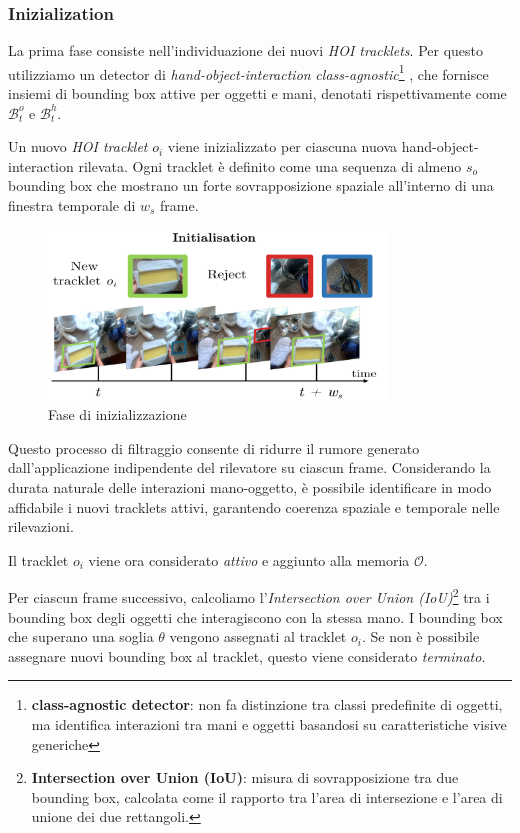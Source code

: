 \subsubsection*{Inizialization}
La prima fase consiste nell'individuazione dei nuovi \emph{HOI tracklets}. Per questo utilizziamo un detector di \emph{hand-object-interaction} \emph{class-agnostic}\footnote{\textbf{class-agnostic detector}: non fa distinzione tra classi predefinite di oggetti, ma identifica interazioni tra mani e oggetti basandosi su caratteristiche visive generiche} \cite{shan2020understandinghumanhandscontact}, che fornisce insiemi di bounding box attive per oggetti e mani, denotati rispettivamente come $\mathcal{B}_t^o$ e $\mathcal{B}_t^h$.

Un nuovo \emph{HOI tracklet} $o_i$ viene inizializzato per ciascuna nuova hand-object-interaction rilevata. Ogni tracklet è definito come una sequenza di almeno $s_o$ bounding box che mostrano un forte sovrapposizione spaziale all'interno di una finestra temporale di $w_s$ frame.

\begin{figure}[ht]
    \centering
    \includegraphics[width=0.8\textwidth]{Images/init.png}
    \caption{Fase di inizializzazione}
    \label{fig:init}
\end{figure}

Questo processo di filtraggio consente di ridurre il rumore generato dall'applicazione indipendente del rilevatore su ciascun frame. Considerando la durata naturale delle interazioni mano-oggetto, è possibile identificare in modo affidabile i nuovi tracklets attivi, garantendo coerenza spaziale e temporale nelle rilevazioni.  

Il tracklet $o_i$ viene ora considerato \emph{attivo} e aggiunto alla memoria $\mathcal{O}$.  

Per ciascun frame successivo, calcoliamo l'\emph{Intersection over Union (IoU)}\footnote{\textbf{Intersection over Union (IoU)}: misura di sovrapposizione tra due bounding box, calcolata come il rapporto tra l'area di intersezione e l'area di unione dei due rettangoli.} tra i bounding box degli oggetti che interagiscono con la stessa mano. I bounding box che superano una soglia $\theta$ vengono assegnati al tracklet $o_i$. Se non è possibile assegnare nuovi bounding box al tracklet, questo viene considerato \emph{terminato}.

